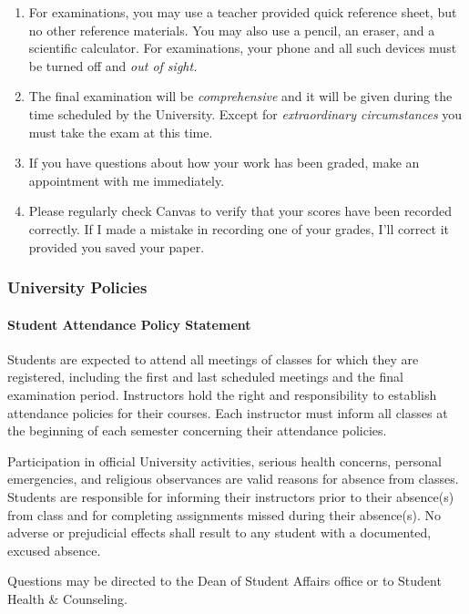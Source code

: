 \documentclass[12pt]{article}
\newcounter{ex}\setcounter{ex}{0}
\begin{document}
\begin{enumerate}
\item For examinations, you may use a teacher provided quick reference sheet, 
but no other reference materials. You may also use a pencil, an eraser, 
and a scientific calculator. For examinations, your phone and all such
devices must be turned off and \emph{out of sight.} 

\item The final examination will be \emph{comprehensive} and it will be given 
during the  time scheduled by the University. Except for \emph{extraordinary circumstances}
you must take the exam at this time.
 
\item If you have questions about how your work has been graded, make an appointment with me immediately.

\item Please regularly check Canvas  to verify that your scores have 
been recorded correctly.  If I made a mistake in recording one of
your grades, I'll correct it provided you saved your paper.

\end{enumerate}

\subsubsection*{University Policies}

\paragraph*{Student Attendance Policy Statement}

Students are expected to attend all meetings of classes for which they are 
registered, including the first and last scheduled meetings and the final 
examination period. Instructors hold the right and responsibility to 
establish attendance policies for their courses. Each instructor must 
inform all classes at the beginning of each semester concerning their 
attendance policies.

Participation in official University activities, serious health concerns, 
personal emergencies, and religious observances are valid reasons for absence 
from classes. Students are responsible for informing their instructors prior 
to their absence(s) from class and for completing assignments missed during 
their absence(s). No adverse or prejudicial effects shall result to any student 
with a documented, excused absence.  

Questions may be directed to the Dean of Student Affairs office or to Student 
Health \& Counseling.
\end{document}
